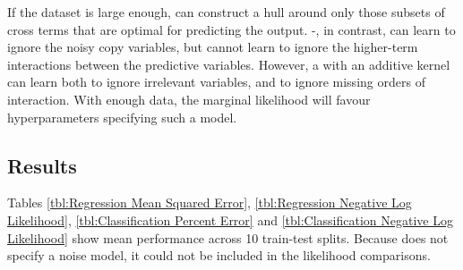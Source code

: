 If the dataset is large enough, \HKL{} can construct a hull around only those subsets of cross terms that are optimal for predicting the output.
\gp{}-\ARD{}, in contrast, can learn to ignore the noisy copy variables, but cannot learn to ignore the higher-term interactions between the predictive variables.
However, a \gp{} with an additive kernel can learn both to ignore irrelevant variables, and to ignore missing orders of interaction.
With enough data, the marginal likelihood will favour hyperparameters specifying such a model.
 
 
\subsection{Results}
Tables \ref{tbl:Regression Mean Squared Error}, \ref{tbl:Regression Negative Log Likelihood}, \ref{tbl:Classification Percent Error} and \ref{tbl:Classification Negative Log Likelihood} show mean performance across 10 train-test splits.
Because \HKL{} does not specify a noise model, it could not be included in the likelihood comparisons.

